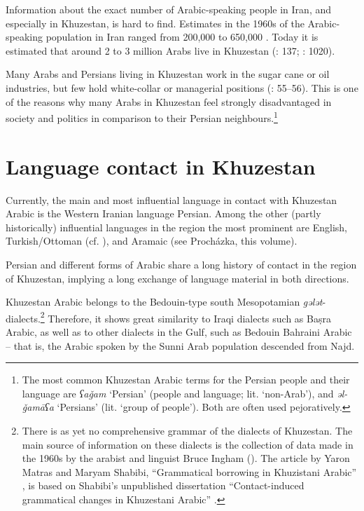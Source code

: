 \documentclass[output=paper,nonflat]{langsci/langscibook}
\begin{document}
Information about the exact number of Arabic-speaking people in Iran, and especially in Khuzestan, is hard to find. Estimates in the 1960s of the Arabic-speaking population in Iran ranged from 200,000 to 650,000 \citep[216]{Oberling1986}. Today it is estimated that around 2 to 3 million Arabs live in Khuzestan (\citealt{MatrasShabibi2007}: 137; \citealt{Gazsi2011}: 1020). 

Many Arabs and Persians living in Khuzestan work in the sugar cane or oil industries, but few hold white-collar or managerial positions (\citealt{DePlanhol1986}: 55–56). This is one of the reasons why many Arabs in Khuzestan feel strongly disadvantaged in society and politics in comparison to their Persian neighbours.\footnote{The most common Khuzestan Arabic terms for the Persian people and their language are \textit{ʕaǧam} ‘Persian' (people and language; lit. `non-Arab'), and \textit{əl-ǧamāʕa} ‘Persians’ (lit. `group of people'). Both are often used pejoratively.} 

\section{Language contact in Khuzestan}

Currently, the main and most influential language in contact with Khuzestan Arabic is the Western Iranian language Persian. Among the other (partly historically) influential languages in the region the most prominent are English, Turkish/Ottoman (cf. \citealt{Ingham2005}), and Aramaic (see Procházka, this volume).

Persian and different forms of Arabic share a long history of contact in the region of Khuzestan, implying a long exchange of language material in both directions. 

Khuzestan Arabic belongs to the Bedouin-type south Mesopotamian \textit{gələt}-dialects.\footnote{There is as yet no comprehensive grammar of the dialects of Khuzestan. The main source of information on these dialects is the collection of data made in the 1960s by the arabist and linguist Bruce Ingham (\citeyear{Ingham1973,Ingham1976,Ingham2011khuz}). The article by Yaron Matras and Maryam Shabibi, “Grammatical borrowing in Khuzistani Arabic” \citep{MatrasShabibi2007}, is based on Shabibi’s unpublished dissertation “Contact-induced grammatical changes in Khuzestani Arabic” \citep{Shabibi2006}.} Therefore, it shows great similarity to Iraqi dialects such as Baṣra Arabic, as well as to other dialects in the Gulf, such as Bedouin Bahraini Arabic – that is, the Arabic spoken by the Sunni Arab population descended from Najd. 
\end{document}

